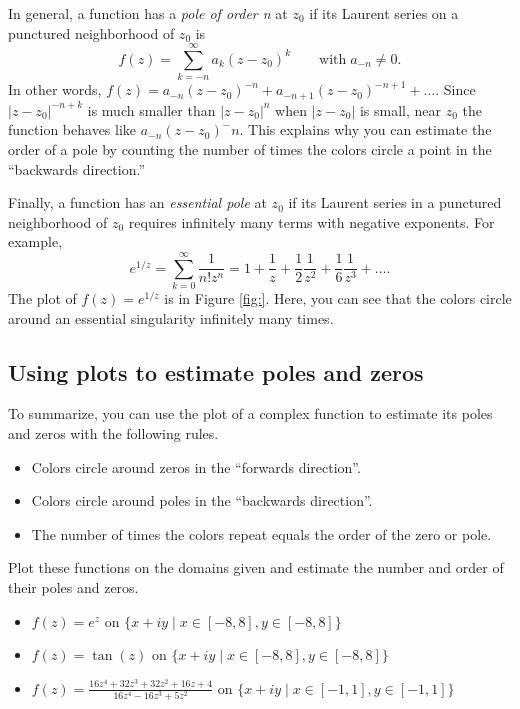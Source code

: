 In general, a function has a \emph{pole of order n} at $z_0$ if its Laurent series on a punctured neighborhood of $z_0$ is
\[
f(z) = \sum_{k=-n}^\infty a_k(z-z_0)^k  \qquad \text{with} \; a_{-n} \neq 0.
\]
In other words, $f(z) = a_{-n}(z-z_0)^{-n}+a_{-n+1}(z-z_0)^{-n+1} + \ldots$.
Since $|z-z_0|^{-n+k}$ is much smaller than $|z-z_0|^n$ when $|z-z_0|$ is small, near $z_0$ the function behaves like $a_{-n}(z-z_0)^-n$.
This explains why you can estimate the order of a pole by counting the number of times the colors circle a point in the ``backwards direction.''

Finally, a function has an \emph{essential pole} at $z_0$ if its Laurent series in a punctured neighborhood of $z_0$ requires infinitely many terms with negative exponents.
For example, 
\[
e^{1/z} = \sum_{k=0}^{\infty}\frac{1}{n! z^n} = 1+\frac{1}{z}+\frac{1}{2}\frac{1}{z^2}+\frac{1}{6}\frac{1}{z^3}+\ldots.
\]
The plot of $f(z) = e^{1/z}$ is in Figure \ref{fig:}. 
Here, you can see that the colors circle around an essential singularity infinitely many times.

\subsection*{Using plots to estimate poles and zeros}
To summarize, you can use the plot of a complex function to estimate its poles and zeros with the following rules.
\begin{itemize}
\item Colors circle around zeros in the ``forwards direction''.
\item Colors circle around poles in the ``backwards direction''.
\item The number of times the colors repeat equals the order of the zero or pole.
\end{itemize}

\begin{problem}\label{prob:findpz}
Plot these functions on the domains given and estimate the number and order of their poles and zeros.
\begin{itemize}
\item $f(z) = e^z$ on $\{ x+iy \mid x \in [-8,8], y \in [-8,8]\}$
\item $f(z) = \tan(z)$ on $\{x+iy \mid x \in [-8,8], y \in [-8,8]\}$
\item $f(z) = \frac{16z^4+32z^3+32z^2+16z+4}{16z^4-16z^3+5z^2}$ on $\{x+iy \mid x \in [-1,1], y \in [-1,1]\}$
\end{itemize}
\end{problem}


